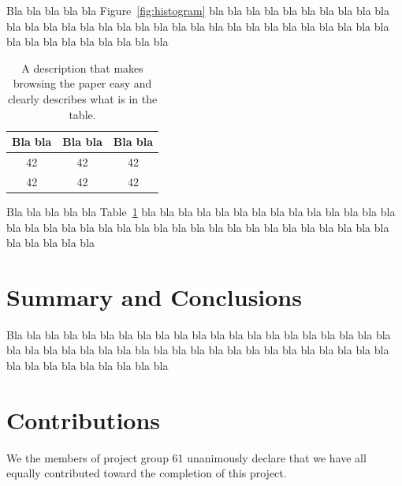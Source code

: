 \documentclass[a4paper,12pt]{article}
\begin{document}
Bla bla bla bla bla Figure~\ref{fig:histogram} bla bla bla bla bla bla 
bla bla bla bla bla bla bla bla bla bla bla bla bla bla bla bla bla 
bla bla bla bla bla bla bla bla bla bla bla bla bla bla bla bla bla 

\begin{table}
\begin{center}
\begin{tabular}{|c|c|c|}
\hline
Bla bla & Bla bla & Bla bla \\ \hline
42 & 42 & 42 \\ \hline
42 & 42 & 42 \\ \hline
\end{tabular}
\caption{A description that makes browsing the paper easy and clearly 
describes what is in the table.}
\label{tab:results}
\end{center}
\end{table}

Bla bla bla bla bla Table~\ref{tab:results} bla bla bla bla bla bla 
bla bla bla bla bla bla bla bla bla bla bla bla bla bla bla bla bla 
bla bla bla bla bla bla bla bla bla bla bla bla bla bla bla bla bla 

\section{Summary and Conclusions}
\label{sec:summary}

Bla bla bla bla bla bla bla bla bla bla bla bla bla bla bla bla bla 
bla bla bla bla bla bla bla bla bla bla bla bla bla bla bla bla bla 
bla bla bla bla bla bla bla bla bla bla bla bla bla bla bla bla bla 


\section{Contributions}
\label{sec:contributions}
We the members of project group 61 unanimously declare that 
we have all equally contributed toward the completion of this
project.



\end{document}
